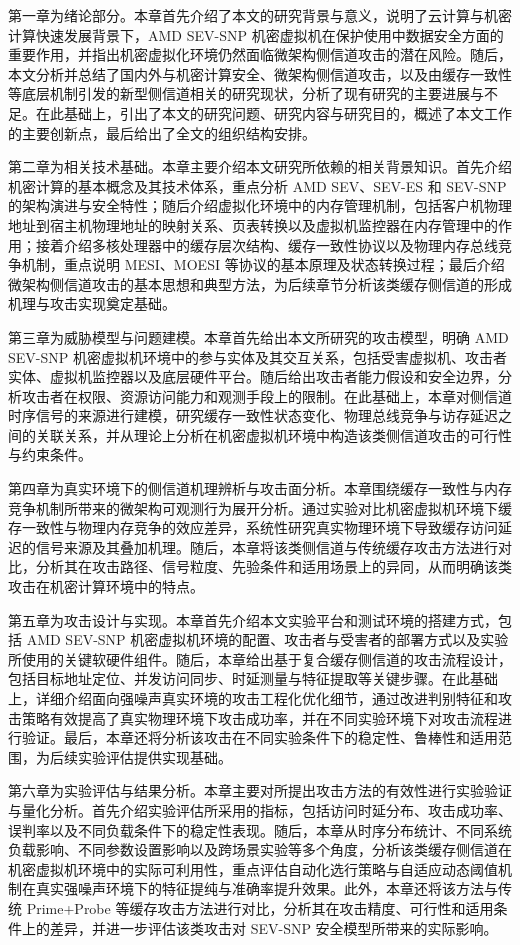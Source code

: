 第一章为绪论部分。本章首先介绍了本文的研究背景与意义，说明了云计算与机密计算快速发展背景下，AMD SEV-SNP 机密虚拟机在保护使用中数据安全方面的重要作用，并指出机密虚拟化环境仍然面临微架构侧信道攻击的潜在风险。随后，本文分析并总结了国内外与机密计算安全、微架构侧信道攻击，以及由缓存一致性等底层机制引发的新型侧信道相关的研究现状，分析了现有研究的主要进展与不足。在此基础上，引出了本文的研究问题、研究内容与研究目的，概述了本文工作的主要创新点，最后给出了全文的组织结构安排。

第二章为相关技术基础。本章主要介绍本文研究所依赖的相关背景知识。首先介绍机密计算的基本概念及其技术体系，重点分析 AMD SEV、SEV-ES 和 SEV-SNP 的架构演进与安全特性；随后介绍虚拟化环境中的内存管理机制，包括客户机物理地址到宿主机物理地址的映射关系、页表转换以及虚拟机监控器在内存管理中的作用；接着介绍多核处理器中的缓存层次结构、缓存一致性协议以及物理内存总线竞争机制，重点说明 MESI、MOESI 等协议的基本原理及状态转换过程；最后介绍微架构侧信道攻击的基本思想和典型方法，为后续章节分析该类缓存侧信道的形成机理与攻击实现奠定基础。

第三章为威胁模型与问题建模。本章首先给出本文所研究的攻击模型，明确 AMD SEV-SNP 机密虚拟机环境中的参与实体及其交互关系，包括受害虚拟机、攻击者实体、虚拟机监控器以及底层硬件平台。随后给出攻击者能力假设和安全边界，分析攻击者在权限、资源访问能力和观测手段上的限制。在此基础上，本章对侧信道时序信号的来源进行建模，研究缓存一致性状态变化、物理总线竞争与访存延迟之间的关联关系，并从理论上分析在机密虚拟机环境中构造该类侧信道攻击的可行性与约束条件。

第四章为真实环境下的侧信道机理辨析与攻击面分析。本章围绕缓存一致性与内存竞争机制所带来的微架构可观测行为展开分析。通过实验对比机密虚拟机环境下缓存一致性与物理内存竞争的效应差异，系统性研究真实物理环境下导致缓存访问延迟的信号来源及其叠加机理。随后，本章将该类侧信道与传统缓存攻击方法进行对比，分析其在攻击路径、信号粒度、先验条件和适用场景上的异同，从而明确该类攻击在机密计算环境中的特点。

第五章为攻击设计与实现。本章首先介绍本文实验平台和测试环境的搭建方式，包括 AMD SEV-SNP 机密虚拟机环境的配置、攻击者与受害者的部署方式以及实验所使用的关键软硬件组件。随后，本章给出基于复合缓存侧信道的攻击流程设计，包括目标地址定位、并发访问同步、时延测量与特征提取等关键步骤。在此基础上，详细介绍面向强噪声真实环境的攻击工程化优化细节，通过改进判别特征和攻击策略有效提高了真实物理环境下攻击成功率，并在不同实验环境下对攻击流程进行验证。最后，本章还将分析该攻击在不同实验条件下的稳定性、鲁棒性和适用范围，为后续实验评估提供实现基础。

第六章为实验评估与结果分析。本章主要对所提出攻击方法的有效性进行实验验证与量化分析。首先介绍实验评估所采用的指标，包括访问时延分布、攻击成功率、误判率以及不同负载条件下的稳定性表现。随后，本章从时序分布统计、不同系统负载影响、不同参数设置影响以及跨场景实验等多个角度，分析该类缓存侧信道在机密虚拟机环境中的实际可利用性，重点评估自动化选行策略与自适应动态阈值机制在真实强噪声环境下的特征提纯与准确率提升效果。此外，本章还将该方法与传统 Prime+Probe 等缓存攻击方法进行对比，分析其在攻击精度、可行性和适用条件上的差异，并进一步评估该类攻击对 SEV-SNP 安全模型所带来的实际影响。

